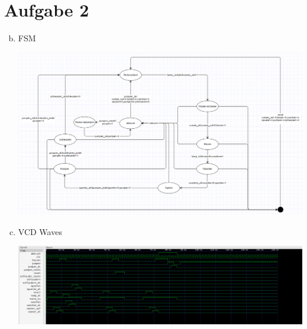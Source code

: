 \documentclass[a4paper]{scrartcl}
\begin{document}
	
	\section*{Aufgabe 2}
	\begin{enumerate}[(a)]
		\setcounter{enumi}{1}
		\item FSM
		
		\includegraphics[width = 1.0\textwidth]{waschmaschine_fsm}
		\item VCD Waves
		
		\includegraphics[width = 1.0\textwidth]{wave}
		
	\end{enumerate}
	
\end{document}
